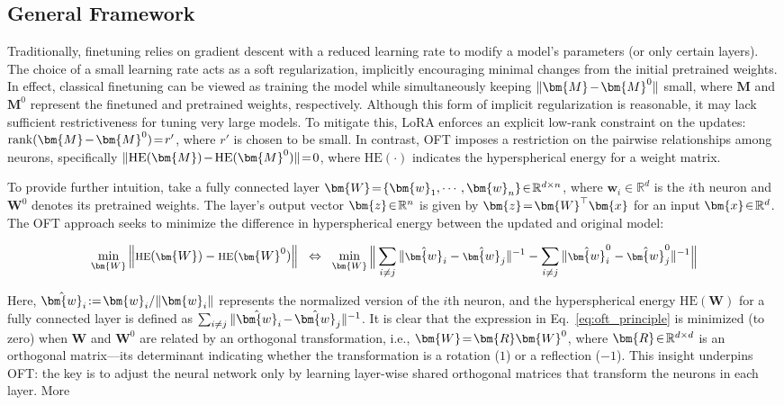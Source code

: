 \subsection{General Framework}

Traditionally, finetuning relies on gradient descent with a reduced learning rate to modify a model’s parameters (or only certain layers). The choice of a small learning rate acts as a soft regularization, implicitly encouraging minimal changes from the initial pretrained weights. In effect, classical finetuning can be viewed as training the model while simultaneously keeping $\thickmuskip=2mu \medmuskip=2mu \| \bm{M} - \bm{M}^0\|$ small, where $\bm{M}$ and $\bm{M}^0$ represent the finetuned and pretrained weights, respectively. Although this form of implicit regularization is reasonable, it may lack sufficient restrictiveness for tuning very large models. To mitigate this, LoRA enforces an explicit low-rank constraint on the updates: $\thickmuskip=2mu \medmuskip=2mu \text{rank}(\bm{M} - \bm{M}^0)=r'$, where $r'$ is chosen to be small. In contrast, OFT imposes a restriction on the pairwise relationships among neurons, specifically $\thickmuskip=2mu \medmuskip=2mu \| \text{HE}(\bm{M})-\text{HE}(\bm{M}^0) \|=0$, where $\text{HE}(\cdot)$ indicates the hyperspherical energy for a weight matrix. 

To provide further intuition, take a fully connected layer $\thickmuskip=2mu \medmuskip=2mu \bm{W}=\{\bm{w}_1,\cdots,\bm{w}_n\}\in\mathbb{R}^{d\times n}$, where $\bm{w}_i\in\mathbb{R}^{d}$ is the $i$th neuron and $\bm{W}^0$ denotes its pretrained weights. The layer's output vector $\thickmuskip=2mu \medmuskip=2mu \bm{z}\in\mathbb{R}^n$ is given by $\thickmuskip=2mu \medmuskip=2mu \bm{z}=\bm{W}^\top\bm{x}$ for an input $\thickmuskip=2mu \medmuskip=2mu \bm{x}\in\mathbb{R}^d$. The OFT approach seeks to minimize the difference in hyperspherical energy between the updated and original model:

\begin{equation}\label{eq:oft_principle}
\footnotesize
\min_{\bm{W}} \left\| \text{HE}(\bm{W})-\text{HE}(\bm{W}^0)\right\|~~\Leftrightarrow~~\min_{\bm{W}} \bigg{\|} \sum_{i\neq j} \|\hat{\bm{w}}_i-\hat{\bm{w}}_j\|^{-1}-\sum_{i\neq j} \|\hat{\bm{w}}^0_i-\hat{\bm{w}}^0_j\|^{-1}\bigg{\|}
\end{equation}

Here, $\thickmuskip=2mu \medmuskip=2mu \hat{\bm{w}}_i:=\bm{w}_i/\|\bm{w}_i\|$ represents the normalized version of the $i$th neuron, and the hyperspherical energy $\text{HE}(\bm{W})$ for a fully connected layer is defined as $\thickmuskip=2mu \medmuskip=2mu \sum_{i\neq j} \|\hat{\bm{w}}_i-\hat{\bm{w}}_j\|^{-1}$. It is clear that the expression in Eq.~\eqref{eq:oft_principle} is minimized (to zero) when $\bm{W}$ and $\bm{W}^0$ are related by an orthogonal transformation, i.e., $\thickmuskip=2mu \medmuskip=2mu \bm{W}=\bm{R}\bm{W}^0$, where $\thickmuskip=2mu \medmuskip=2mu \bm{R}\in\mathbb{R}^{d\times d}$ is an orthogonal matrix—its determinant indicating whether the transformation is a rotation ($1$) or a reflection ($-1$). This insight underpins OFT: the key is to adjust the neural network only by learning layer-wise shared orthogonal matrices that transform the neurons in each layer. More

